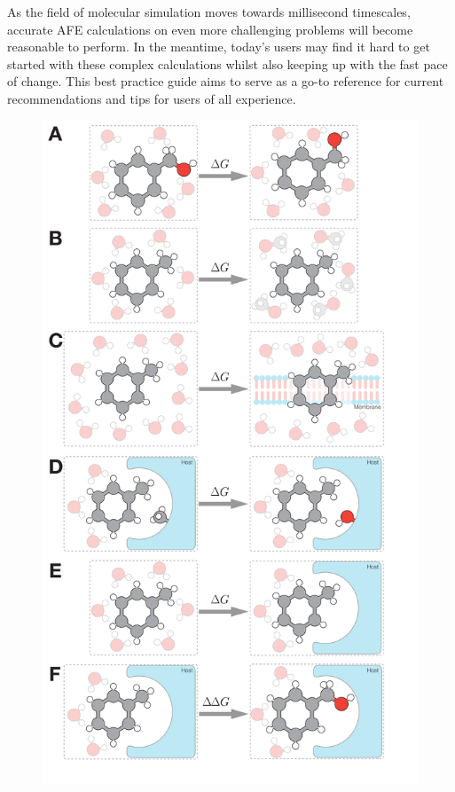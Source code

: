 \documentclass[9pt,bestpractices]{livecoms}
\begin{document}
As the field of molecular simulation moves towards millisecond timescales, accurate AFE calculations on even more challenging problems will become reasonable to perform. In the meantime, today's users may find it hard to get started with these complex calculations whilst also keeping up with the fast pace of change. This best practice guide aims to serve as a go-to reference for current recommendations and tips for users of all experience.  

\begin{figure}
    \includegraphics[width=0.95\linewidth]{figures/fig1_what_is_alchemy/Figure.pdf}   

\end{figure}
\end{document}
